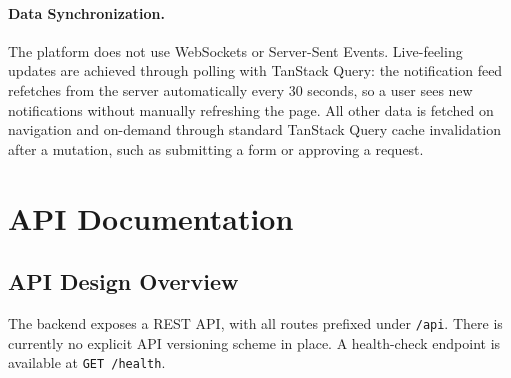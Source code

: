 \documentclass[12pt]{article}
\begin{document}
\paragraph{Data Synchronization.} The platform does not use WebSockets or Server-Sent Events. Live-feeling updates are achieved through polling with TanStack Query: the notification feed refetches from the server automatically every 30 seconds, so a user sees new notifications without manually refreshing the page. All other data is fetched on navigation and on-demand through standard TanStack Query cache invalidation after a mutation, such as submitting a form or approving a request.

\section{API Documentation}

\subsection{API Design Overview}
The backend exposes a REST API, with all routes prefixed under \texttt{/api}. There is currently no explicit API versioning scheme in place. A health-check endpoint is available at \texttt{GET /health}.
\end{document}
